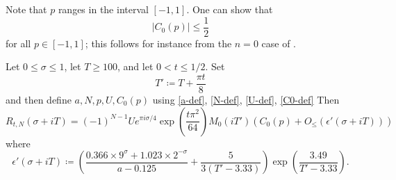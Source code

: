 Note that $p$ ranges in the interval $[-1,1]$.  One can show that 
\begin{equation}\label{cop}
|C_0(p)| \leq \frac{1}{2}
\end{equation}
for all $p \in [-1,1]$; this follows for instance from the $n=0$ case of \cite[Theorem 6.1]{arias}.


\begin{proposition}  Let $0 \leq \sigma \leq 1$, let $T \geq 100$, and let $0 < t \leq 1/2$.  Set
$$ T' \coloneqq T + \frac{\pi t}{8} $$
and then define $a,N,p,U,C_0(p)$ using \eqref{a-def}, \eqref{N-def}, \eqref{U-def}, \eqref{C0-def}
Then 
$$
 R_{t,N}(\sigma+iT) = (-1)^{N-1} U e^{\pi i \sigma/4} \exp\left( \frac{t \pi^2}{64}\right) M_0(iT') ( C_0(p) + O_{\leq}( \epsilon'(\sigma+iT)))$$
where
$$ \epsilon'(\sigma+iT) \coloneqq \left(\frac{0.366 \times 9^\sigma + 1.023 \times 2^{-\sigma}}{a-0.125} + \frac{5}{3(T'-3.33)}\right) \exp\left( \frac{3.49}{T'-3.33} \right).$$
\end{proposition}

